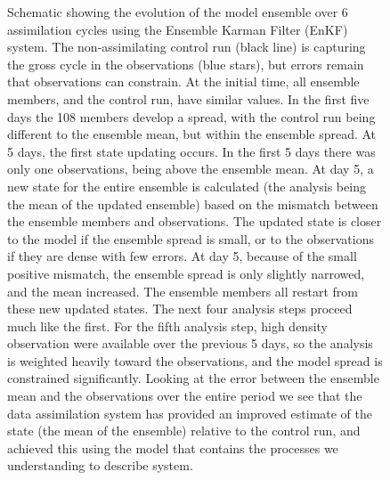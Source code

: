 \documentclass{elsart}
\begin{document}
\begin{figure}[thb]
\begin{center}
\caption{Schematic showing the evolution of the model ensemble over 6 assimilation cycles using the Ensemble Karman Filter (EnKF) system. The non-assimilating control run (black line) is capturing the gross cycle in the observations (blue stars), but errors remain that observations can constrain. At the initial time, all ensemble members, and the control run, have similar values.  In the first five days the 108 members develop a spread, with the control run being different to the ensemble mean, but within the ensemble spread. At 5 days, the first state updating occurs. In the first 5 days there was only one observations, being above the ensemble mean. At day 5, a new state for the entire ensemble is calculated (the analysis being the mean of the updated ensemble) based on the mismatch between the ensemble members and observations. The updated state is closer to the model if the ensemble spread is small, or to the observations if they are dense with few errors. At day 5, because of the small positive mismatch, the ensemble spread is only slightly narrowed, and the mean increased. The ensemble members all restart from these new updated states. The next four analysis steps proceed much like the first. For the fifth analysis step, high density observation were available over the previous 5 days, so the analysis is weighted heavily toward the observations, and the model spread is constrained significantly. Looking at the error between the ensemble mean and the observations over the entire period we see that the data assimilation system has provided an improved estimate of the state (the mean of the ensemble) relative to the control run, and achieved this using the model that contains the processes we understanding to describe system.}
\label{fig:da}
\end{center}
\end{figure}
\end{document}
